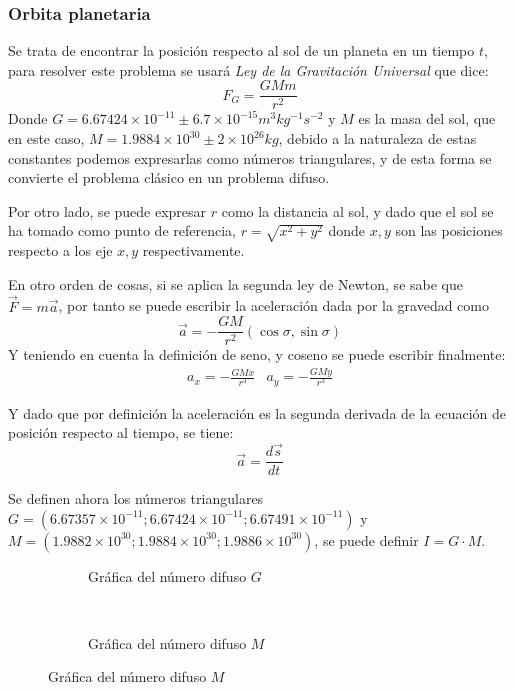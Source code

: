 \subsubsection{Orbita planetaria}
\begin{ejemplo}
	Se trata de encontrar la posición respecto al sol de un planeta en un tiempo $t$, para resolver este problema se usará \textit{Ley de la Gravitación Universal} que dice:
	\[
	F_G = \frac{GM m}{r^2}
	\]
	Donde $G=6.67424 \times 10^{-11} \pm 6.7 \times 10^{-15} m^3 kg^{-1} s^{-2}$ y $M$ es la masa del sol, que en este caso, $M=1.9884\times 10^{30} \pm 2 \times 10^{26} kg$, debido a la naturaleza de estas constantes podemos expresarlas como números triangulares, y de esta forma se convierte el problema clásico en un problema difuso.
	
	Por otro lado, se puede expresar $r$ como la distancia al sol, y dado que el sol se ha tomado como punto de referencia, $r=\sqrt{x^2+y^2}$ donde $x, y$ son las posiciones respecto a los eje $x, y$ respectivamente.
	
	En otro orden de cosas, si se aplica la segunda ley de Newton, se sabe que $\vec{F} = m \vec{a}$, por tanto se puede escribir la aceleración dada por la gravedad como 
	\[
	\vec{a} = -\frac{GM}{r^2} \left(
	\cos{\sigma}, \sin{\sigma}
	\right)
	\]
	Y teniendo en cuenta la definición de seno, y coseno se puede escribir finalmente:
	\[
	\begin{array}{l||r}
	a_x = - \frac{GMx}{r^3} & a_y = - \frac{GMy}{r^3}
	\end{array}
	\]
	
	Y dado que por definición la aceleración es la segunda derivada de la ecuación de posición respecto al tiempo, se tiene:
	\[
	\vec{a} = \frac{d\vec{s}}{dt}
	\]
	
	Se definen ahora los números triangulares $G=(6.67357\times10^{-11};6.67424 \times 10^{-11};6.67491\times10^{-11})$ y $M=(1.9882\times10^{30};1.9884\times 10^{30}
	;1.9886\times10^{30})$, se puede definir $I=G\cdot M$.
	
	
	\begin{figure}[h]
		\centering
		\begin{subfigure}[b]{0.49\textwidth}
			\caption{Gráfica del número difuso $G$}
			\label{fig:triangular_g}
		\end{subfigure}
		~ 
		\begin{subfigure}[b]{0.49\textwidth}
			\caption{Gráfica del número difuso $M$}
			\label{fig:triangular_m}
		\end{subfigure}
	\end{figure}
	

\end{ejemplo}
